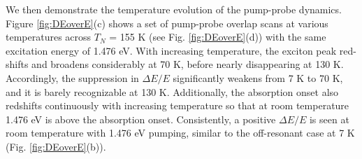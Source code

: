 \documentclass[%
 reprint,
superscriptaddress,
 amsmath,amssymb,
 aps,
]{revtex4-2}
\begin{document}
We then demonstrate the temperature evolution of the pump-probe dynamics. Figure \ref{fig:DEoverE}(c) shows a set of pump-probe overlap scans at various temperatures across $T_N$ = 155 K (see Fig. \ref{fig:DEoverE}(d)) with the same excitation energy of 1.476 eV. With increasing temperature, the exciton peak red-shifts and broadens considerably at 70 K, before nearly disappearing at 130 K\cite{Kang2020,Wang2021,Hwangbo2021,Kim2023}. Accordingly, the suppression in $\Delta E/E$ significantly weakens from 7 K to 70 K, and it is barely recognizable at 130 K. Additionally, the absorption onset also redshifts continuously with increasing temperature so that at room temperature 1.476 eV is above the absorption onset\cite{Ho2021}. Consistently, a positive $\Delta E/E$ is seen at room temperature with 1.476 eV pumping, similar to the off-resonant case at 7 K (Fig. \ref{fig:DEoverE}(b)).    
\end{document}
